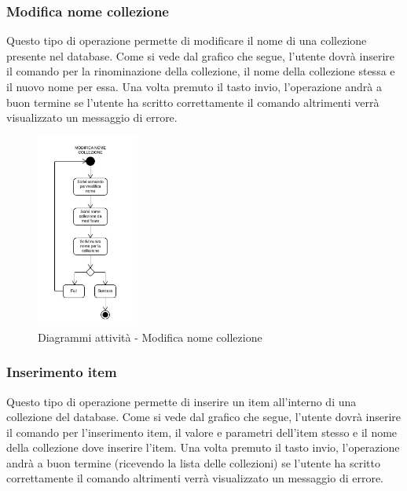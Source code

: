 \documentclass{scalatekids-article}
\begin{document}
\subsubsection{Modifica nome collezione}

Questo tipo di operazione permette di modificare il nome di una collezione
presente nel database. Come si vede dal grafico che segue, l'utente dovrà
inserire il comando per la rinominazione della collezione, il nome della
collezione stessa e il nuovo nome per essa. Una volta premuto il tasto invio,
l'operazione andrà a buon termine se l'utente ha scritto correttamente il
comando altrimenti verrà visualizzato un messaggio di errore.

\begin{figure}[H]
  \begin{center}
    \includegraphics[width=0.3\textwidth, keepaspectratio]{img/diagrammiAttivita/modNomeCollezione.jpeg}
    \caption{Diagrammi attività - Modifica nome collezione}
  \end{center}
\end{figure}

\subsubsection{Inserimento item}

Questo tipo di operazione permette di inserire un item all'interno di una
collezione del database. Come si vede dal grafico che segue, l'utente dovrà
inserire il comando per l'inserimento item, il valore e parametri dell'item
stesso e il nome della collezione dove inserire l'item. Una volta premuto il
tasto invio, l'operazione andrà a buon termine (ricevendo la lista delle
collezioni) se l'utente ha scritto correttamente il comando altrimenti verrà
visualizzato un messaggio di errore.
\end{document}
